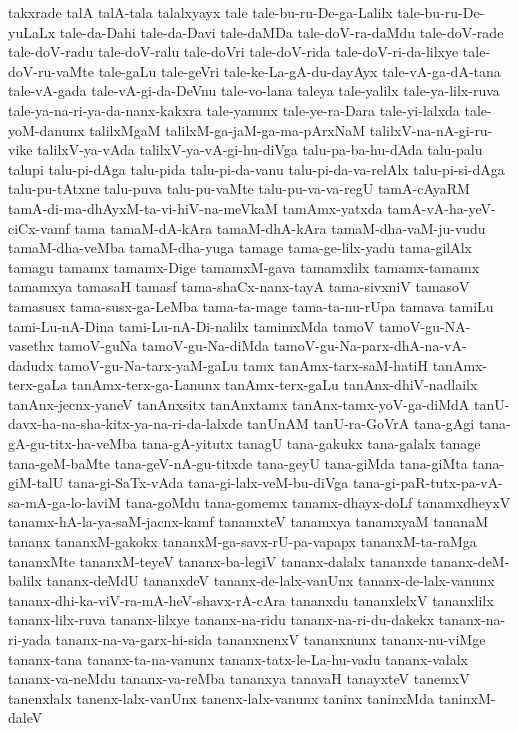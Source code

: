 {takxrade
talA
talA-tala
talalxyayx
tale
tale-bu-ru-De-ga-Lalilx
tale-bu-ru-De-yuLaLx
tale-da-Dahi
tale-da-Davi
tale-daMDa
tale-doV-ra-daMdu
tale-doV-rade
tale-doV-radu
tale-doV-ralu
tale-doVri
tale-doV-rida
tale-doV-ri-da-lilxye
tale-doV-ru-vaMte
tale-gaLu
tale-geVri
tale-ke-La-gA-du-dayAyx
tale-vA-ga-dA-tana
tale-vA-gada
tale-vA-gi-da-DeVnu
tale-vo-lana
taleya
tale-yalilx
tale-ya-lilx-ruva
tale-ya-na-ri-ya-da-nanx-kakxra
tale-yanunx
tale-ye-ra-Dara
tale-yi-lalxda
tale-yoM-danunx
talilxMgaM
talilxM-ga-jaM-ga-ma-pArxNaM
talilxV-na-nA-gi-ru-vike
talilxV-ya-vAda
talilxV-ya-vA-gi-hu-diVga
talu-pa-ba-hu-dAda
talu-palu
talupi
talu-pi-dAga
talu-pida
talu-pi-da-vanu
talu-pi-da-va-relAlx
talu-pi-si-dAga
talu-pu-tAtxne
talu-puva
talu-pu-vaMte
talu-pu-va-va-regU
tamA-cAyaRM
tamA-di-ma-dhAyxM-ta-vi-hiV-na-meVkaM
tamAmx-yatxda
tamA-vA-ha-yeV-ciCx-vamf
tama
tamaM-dA-kAra
tamaM-dhA-kAra
tamaM-dha-vaM-ju-vudu
tamaM-dha-veMba
tamaM-dha-yuga
tamage
tama-ge-lilx-yadu
tama-gilAlx
tamagu
tamamx
tamamx-Dige
tamamxM-gava
tamamxlilx
tamamx-tamamx
tamamxya
tamasaH
tamasf
tama-shaCx-nanx-tayA
tama-sivxniV
tamasoV
tamasusx
tama-susx-ga-LeMba
tama-ta-mage
tama-ta-nu-rUpa
tamava
tamiLu
tami-Lu-nA-Dina
tami-Lu-nA-Di-nalilx
tamimxMda
tamoV
tamoV-gu-NA-vasethx
tamoV-guNa
tamoV-gu-Na-diMda
tamoV-gu-Na-parx-dhA-na-vA-dadudx
tamoV-gu-Na-tarx-yaM-gaLu
tamx
tanAmx-tarx-saM-hatiH
tanAmx-terx-gaLa
tanAmx-terx-ga-Lanunx
tanAmx-terx-gaLu
tanAnx-dhiV-nadlailx
tanAnx-jecnx-yaneV
tanAnxsitx
tanAnxtamx
tanAnx-tamx-yoV-ga-diMdA
tanU-davx-ha-na-sha-kitx-ya-na-ri-da-lalxde
tanUnAM
tanU-ra-GoVrA
tana-gAgi
tana-gA-gu-titx-ha-veMba
tana-gA-yitutx
tanagU
tana-gakukx
tana-galalx
tanage
tana-geM-baMte
tana-geV-nA-gu-titxde
tana-geyU
tana-giMda
tana-giMta
tana-giM-talU
tana-gi-SaTx-vAda
tana-gi-lalx-veM-bu-diVga
tana-gi-paR-tutx-pa-vA-sa-mA-ga-lo-laviM
tana-goMdu
tana-gomemx
tanamx-dhayx-doLf
tanamxdheyxV
tanamx-hA-la-ya-saM-jacnx-kamf
tanamxteV
tanamxya
tanamxyaM
tananaM
tananx
tananxM-gakokx
tananxM-ga-savx-rU-pa-vapapx
tananxM-ta-raMga
tananxMte
tananxM-teyeV
tananx-ba-legiV
tananx-dalalx
tananxde
tananx-deM-balilx
tananx-deMdU
tananxdeV
tananx-de-lalx-vanUnx
tananx-de-lalx-vanunx
tananx-dhi-ka-viV-ra-mA-heV-shavx-rA-cAra
tananxdu
tananxlelxV
tananxlilx
tananx-lilx-ruva
tananx-lilxye
tananx-na-ridu
tananx-na-ri-du-dakekx
tananx-na-ri-yada
tananx-na-va-garx-hi-sida
tananxnenxV
tananxnunx
tananx-nu-viMge
tananx-tana
tananx-ta-na-vanunx
tananx-tatx-le-La-hu-vadu
tananx-valalx
tananx-va-neMdu
tananx-va-reMba
tananxya
tanavaH
tanayxteV
tanemxV
tanenxlalx
tanenx-lalx-vanUnx
tanenx-lalx-vanunx
taninx
taninxMda
taninxM-daleV
}
